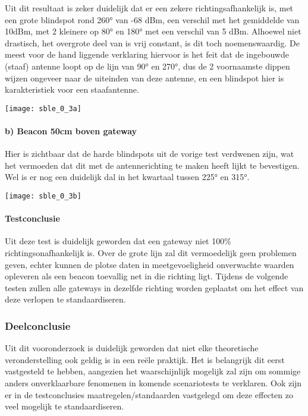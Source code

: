 \begin{minipage}{0.55\textwidth}
Uit dit resultaat is zeker duidelijk dat er een zekere richtingsafhankelijk is, met een grote blindspot rond 260° van -68 dBm, een verschil met het gemiddelde van 10dBm, met 2 kleinere op 80° en 180° met een verschil van 5 dBm. Alhoewel niet drastisch, het overgrote deel van is vrij constant, is dit toch noemenswaardig. De meest voor de hand liggende verklaring hiervoor is het feit dat de ingebouwde (staaf) antenne loopt op de lijn van 90° en 270°, dus de 2 voornaamste dippen wijzen ongeveer naar de uiteinden van deze antenne, en een blindspot hier is karakteristiek voor een staafantenne.
\end{minipage}
\hfill
\begin{minipage}{0.42\textwidth}
	\texttt{[image: sble\_0\_3a]}
	\label{fig:ond-ble-3a-res}
\end{minipage}


\paragraph{b) Beacon 50cm boven gateway}

\begin{minipage}{0.55\textwidth}
Hier is zichtbaar dat de harde blindspots uit de vorige test verdwenen zijn, wat het vermoeden dat dit met de antennerichting te maken heeft lijkt te bevestigen. Wel is er nog een duidelijk dal in het kwartaal tussen 225° en 315°.
\end{minipage}
\hfill
\begin{minipage}{0.42\textwidth}
	\texttt{[image: sble\_0\_3b]}
	\label{fig:ond-ble-3b-res}
\end{minipage}

\paragraph{Testconclusie}
Uit deze test is duidelijk geworden dat een gateway niet 100\% richtingsonafhankelijk is. Over de grote lijn zal dit vermoedelijk geen problemen geven, echter kunnen de plotse daten in meetgevoeligheid onverwachte waarden opleveren als een beacon toevallig net in die richting ligt.
Tijdens de volgende testen zullen alle gateways in dezelfde richting worden geplaatst om het effect van deze verlopen te standaardiseren. 

\subsubsection{Deelconclusie}
Uit dit vooronderzoek is duidelijk geworden dat niet elke theoretische veronderstelling ook geldig is in een reële praktijk. Het is belangrijk dit eerst vastgesteld te hebben, aangezien het waarschijnlijk mogelijk zal zijn om sommige anders onverklaarbare fenomenen in komende scenariotests te verklaren. Ook zijn er in de testconclusies maatregelen/standaarden vastgelegd om deze effecten zo veel mogelijk te standaardiseren.

